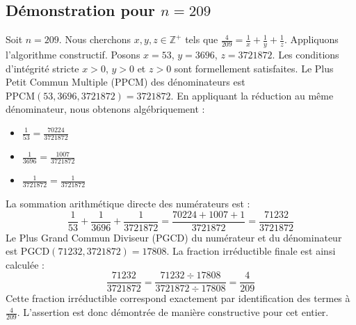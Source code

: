 \documentclass[11pt,a4paper]{article}
\begin{document}
\subsection{Démonstration pour $n = 209$}
Soit $n = 209$. Nous cherchons $x, y, z \in \mathbb{Z}^{+}$ tels que $\frac{4}{209} = \frac{1}{x} + \frac{1}{y} + \frac{1}{z}$.
Appliquons l'algorithme constructif. Posons $x = 53$, $y = 3696$, $z = 3721872$.
Les conditions d'intégrité stricte $x > 0$, $y > 0$ et $z > 0$ sont formellement satisfaites.
Le Plus Petit Commun Multiple (PPCM) des dénominateurs est $\text{PPCM}(53, 3696, 3721872) = 3721872$.
En appliquant la réduction au même dénominateur, nous obtenons algébriquement :
\begin{itemize}
    \item $\frac{1}{53} = \frac{70224}{3721872}$
    \item $\frac{1}{3696} = \frac{1007}{3721872}$
    \item $\frac{1}{3721872} = \frac{1}{3721872}$
\end{itemize}
La sommation arithmétique directe des numérateurs est :
$$ \frac{1}{53} + \frac{1}{3696} + \frac{1}{3721872} = \frac{70224 + 1007 + 1}{3721872} = \frac{71232}{3721872} $$
Le Plus Grand Commun Diviseur (PGCD) du numérateur et du dénominateur est $\text{PGCD}(71232, 3721872) = 17808$.
La fraction irréductible finale est ainsi calculée :
$$ \frac{71232}{3721872} = \frac{71232 \div 17808}{3721872 \div 17808} = \frac{4}{209} $$
Cette fraction irréductible correspond exactement par identification des termes à $\frac{4}{209}$. L'assertion est donc démontrée de manière constructive pour cet entier.
\end{document}
